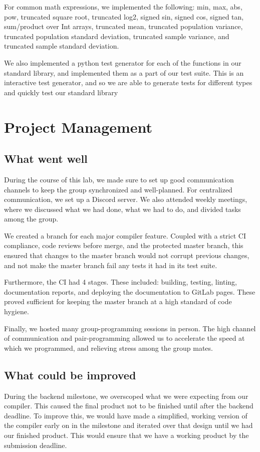 \documentclass{article}
\begin{document}
        For common math expressions, we implemented the following: min, max, abs, pow, truncated square root, truncated log2, signed sin, signed cos, signed tan, sum/product over Int arrays, truncated mean, truncated population variance, truncated population standard deviation, truncated sample variance, and truncated sample standard deviation.
        
        We also implemented a python test generator for each of the functions in our standard library, and implemented them as a part of our test suite. This is an interactive test generator, and so we are able to generate tests for different types and quickly test our standard library

    
    \section*{Project Management}
        \subsection*{What went well}
        During the course of this lab, we made sure to set up good communication channels to keep the group synchronized and well-planned. For centralized communication, we set up a Discord server. We also attended weekly meetings, where we discussed what we had done, what we had to do, and divided tasks among the group.
        
        We created a branch for each major compiler feature. Coupled with a strict CI compliance, code reviews before merge, and the protected master branch, this ensured that changes to the master branch would not corrupt previous changes, and not make the master branch fail any tests it had in its test suite.
        
        Furthermore, the CI had 4 stages. These included: building, testing, linting, documentation reports, and deploying the documentation to GitLab pages. These proved sufficient for keeping the master branch at a high standard of code hygiene.
        
        Finally, we hosted many group-programming sessions in person. The high channel of communication and pair-programming allowed us to accelerate the speed at which we programmed, and relieving stress among the group mates.
        
        \subsection*{What could be improved}
        During the backend milestone, we overscoped what we were expecting from our compiler. This caused the final product not to be finished until after the backend deadline. To improve this, we would have made a simplified, working version of the compiler early on in the milestone and iterated over that design until we had our finished product. This would ensure that we have a working product by the submission deadline.
\end{document}
